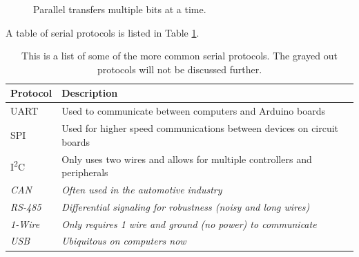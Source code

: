 \begin{figure}[!htb]
	\centering
	\caption{Parallel transfers multiple bits at a time.}
	\label{fig:parallel}
\end{figure}

A table of serial protocols is listed in Table \ref{table:serialTypes}. 

\begin{table}[!ht]
	\centering
	\begin{tabular}{l l}
		\hline
		Protocol & Description \\ 
		\hline
		UART & Used to communicate between computers and Arduino boards \\
		SPI & Used for higher speed communications between devices on circuit boards \\
		I\textsuperscript{2}C & Only uses two wires and allows for multiple controllers and peripherals \\
		\rowcolor{lightgray}\emph{CAN} & \emph{Often used in the automotive industry} \\
		\rowcolor{lightgray}\emph{RS-485} & \emph{Differential signaling for robustness (noisy and long wires)} \\
		\rowcolor{lightgray}\emph{1-Wire}  & \emph{Only requires 1 wire and ground (no power) to communicate} \\
		\rowcolor{lightgray}\emph{USB} & \emph{Ubiquitous on computers now} \\
		\hline
	\end{tabular}
	\caption{This is a list of some of the more common serial protocols. The grayed out protocols will not be discussed further.}
	\label{table:serialTypes}
\end{table}

